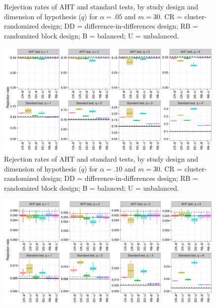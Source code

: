 \documentclass{article}\usepackage[]{graphicx}\usepackage[]{color}
\newenvironment{knitrout}{}{} %
\begin{document}
\begin{landscape}
\begin{knitrout}
\begin{figure}[H]
{}

\caption[Rejection rates of AHT and standard tests, by study design and dimension of hypothesis (]{Rejection rates of AHT and standard tests, by study design and dimension of hypothesis ($q$) for $\alpha = .05$ and $m = 30$. CR = cluster-randomized design; DD = difference-in-differences design; RB = randomized block design; B = balanced; U = unbalanced.}\label{fig:balance_05_30}
\end{figure}


\end{knitrout}

\begin{knitrout}
\color{fgcolor}\begin{figure}[H]

{\centering \includegraphics[width=\linewidth]{CR_fig/balance_10_30-1} 

}

\caption[Rejection rates of AHT and standard tests, by study design and dimension of hypothesis (]{Rejection rates of AHT and standard tests, by study design and dimension of hypothesis ($q$) for $\alpha = .10$ and $m = 30$. CR = cluster-randomized design; DD = difference-in-differences design; RB = randomized block design; B = balanced; U = unbalanced.}\label{fig:balance_10_30}
\end{figure}


\end{knitrout}

\begin{knitrout}
\color{fgcolor}\begin{figure}[H]

{\centering \includegraphics[width=\linewidth]{CR_fig/balance_005_50-1} 

}
\end{figure}
\end{knitrout}
\end{landscape}
\end{document}
